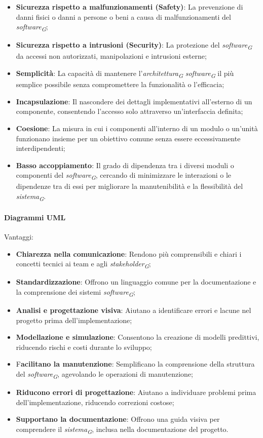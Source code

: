 \begin{itemize}
    \item \textbf{Sicurezza rispetto a malfunzionamenti (Safety)}: La prevenzione di danni fisici o danni a persone o beni a causa di malfunzionamenti del \textit{software}\textsubscript{\textit{G}};
    \item \textbf{Sicurezza rispetto a intrusioni (Security)}: La protezione del \textit{software}\textsubscript{\textit{G}} da accessi non autorizzati, manipolazioni e intrusioni esterne;
    \item \textbf{Semplicità}: La capacità di mantenere l'\textit{architettura}\textsubscript{\textit{G}} \textit{software}\textsubscript{\textit{G}} il più semplice possibile senza compromettere la funzionalità o l'efficacia;
    \item \textbf{Incapsulazione}: Il nascondere dei dettagli implementativi all'esterno di un componente, consentendo l'accesso solo attraverso un'interfaccia definita;
    \item \textbf{Coesione}: La misura in cui i componenti all'interno di un modulo o un'unità funzionano insieme per un obiettivo comune senza essere eccessivamente interdipendenti;
    \item \textbf{Basso accoppiamento}: Il grado di dipendenza tra i diversi moduli o componenti del \textit{software}\textsubscript{\textit{G}}, cercando di minimizzare le interazioni o le dipendenze tra di essi per migliorare la manutenibilità e la flessibilità del \textit{sistema}\textsubscript{\textit{G}}.
\end{itemize}

\paragraph{Diagrammi UML}
Vantaggi:
\begin{itemize}
    \item \textbf{Chiarezza nella comunicazione}: Rendono più comprensibili e chiari i concetti tecnici ai team e agli \textit{stakeholder}\textsubscript{\textit{G}};
    \item \textbf{Standardizzazione}: Offrono un linguaggio comune per la documentazione e la comprensione dei sistemi \textit{software}\textsubscript{\textit{G}};
    \item \textbf{Analisi e progettazione visiva}: Aiutano a identificare errori e lacune nel progetto prima dell'implementazione;
    \item \textbf{Modellazione e simulazione}: Consentono la creazione di modelli predittivi, riducendo rischi e costi durante lo sviluppo;
    \item F\textbf{acilitano la manutenzione}: Semplificano la comprensione della struttura del \textit{software}\textsubscript{\textit{G}}, agevolando le operazioni di manutenzione;
    \item \textbf{Riducono errori di progettazione}: Aiutano a individuare problemi prima dell'implementazione, riducendo correzioni costose;
    \item \textbf{Supportano la documentazione}: Offrono una guida visiva per comprendere il \textit{sistema}\textsubscript{\textit{G}}, inclusa nella documentazione del progetto.
\end{itemize}

